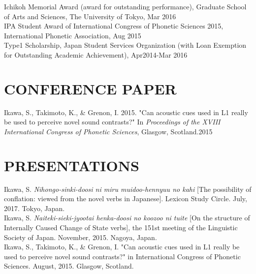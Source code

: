 \documentclass[margin, 12pt]{article} %
\begin{document}
Ichikoh Memorial Award (award for outstanding performance), Graduate School of Arts and Sciences, The University of Tokyo, Mar 2016\\

IPA Student Award of International Congress of Phonetic Sciences 2015, International Phonetic Association, Aug 2015\\

Type1 Scholarship, Japan Student Services Organization (with Loan Exemption for Outstanding Academic Achievement), Apr2014-Mar 2016



\section*{CONFERENCE PAPER} 

Ikawa, S., Takimoto, K., \& Grenon, I. 2015. "Can acoustic cues used in L1 really be used to perceive novel sound contrasts?" In {\sl Proceedings of the XVIII International Congress of Phonetic Sciences}, Glasgow, Scotland.2015 

 
\section*{PRESENTATIONS}

Ikawa, S. {\sl Nihongo-sinki-doosi ni miru muidoo-hennyuu no kahi} [The possibility of conflation: viewed from the novel verbs in Japanese]. Lexicon Study Circle. July, 2017. Tokyo, Japan.\\

Ikawa, S. {\sl Naiteki-sieki-jyootai henka-doosi no koozoo ni tuite} [On the structure of Internally Caused Change of State verbs], the 151st meeting of the Linguistic Society of Japan. November, 2015. Nagoya, Japan. \\

Ikawa, S., Takimoto, K., \& Grenon, I. "Can acoustic cues used in L1 really be used to perceive novel sound contrasts?" in International Congress of Phonetic Sciences. August, 2015. Glasgow, Scotland.\\
\end{document}
